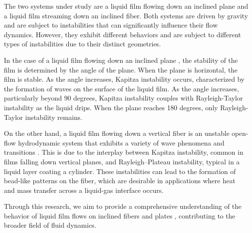 \documentclass[11pt]{article}
\begin{document}
The two systems under study are a liquid film flowing down an inclined plane and a liquid film streaming down an inclined fiber. Both systems are driven by gravity and are subject to instabilities that can significantly influence their flow dynamics. However, they exhibit different behaviors and are subject to different types of instabilities due to their distinct geometries.

In the case of a liquid film flowing down an inclined plane \citep{craster2009dynamics}, the stability of the film is determined by the angle of the plane. When the plane is horizontal, the film is stable. As the angle increases, Kapitza instability occurs, characterized by the formation of waves on the surface of the liquid film. As the angle increases, particularly beyond 90 degrees, Kapitza instability couples with Rayleigh-Taylor instability as the liquid drips. When the plane reaches 180 degrees, only Rayleigh-Taylor instability remains.

On the other hand, a liquid film flowing down a vertical fiber is an unstable open-flow hydrodynamic system that exhibits a variety of wave phenomena and transitions \citep{kalliadasis1994drop, quere1999fluid, kliakhandler2001viscous, craster2006viscous}. This is due to the interplay between Kapitza instability, common in films falling down vertical planes, and Rayleigh–Plateau instability, typical in a liquid layer coating a cylinder. These instabilities can lead to the formation of bead-like patterns on the fiber, which are desirable in applications where heat and mass transfer across a liquid-gas interface occurs.

Through this research, we aim to provide a comprehensive understanding of the behavior of liquid film flows on inclined fibers \citep{pour2023experimental} and plates \citep{craster2009dynamics}, contributing to the broader field of fluid dynamics.
\end{document}
